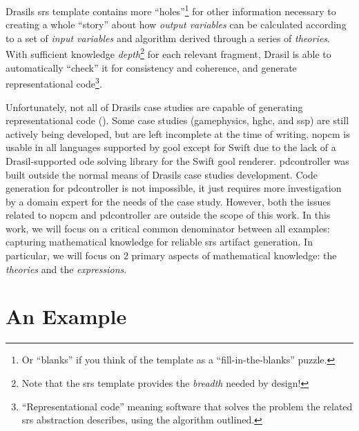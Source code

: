 Drasils \acs{srs} template contains more ``holes''\footnote{Or ``blanks'' if you
      think of the template as a ``fill-in-the-blanks'' puzzle.} for other
information necessary to creating a whole ``story'' about how
\textit{output variables} can be calculated according to a set of
\textit{input variables} and algorithm derived through a series of
\textit{theories}. With sufficient knowledge \textit{depth}\footnote{Note
      that the \acs{srs} template provides the \textit{breadth} needed by
      design!} for each relevant fragment, Drasil is able to automatically
``check'' it for consistency and coherence, and generate representational
code\footnote{``Representational code'' meaning software that solves the
      problem the related \acs{srs} abstraction describes, using the algorithm
      outlined.}.

Unfortunately, not all of Drasils case studies are capable of generating
representational code (). Some case studies
(\acs{gamephysics}, \acs{hghc}, and \acs{ssp}) are still actively being
developed, but are left incomplete at the time of writing. \acs{nopcm} is usable
in all languages supported by \acs{gool} except for Swift due to the lack of a
Drasil-supported \acs{ode} solving library for the Swift \acs{gool} renderer.
\acs{pdcontroller} was built \cite{DrasilPR2289Naveen} outside  the normal means
of Drasils case studies development. Code generation for \acs{pdcontroller} is
not impossible, it just requires more investigation by a domain expert for the
needs of the case study. However, both the issues related to \acs{nopcm} and
\acs{pdcontroller} are outside the scope of this work. In this work, we will
focus on a critical common denominator between all examples: capturing
mathematical knowledge for reliable \acs{srs} artifact generation. In
particular, we will focus on 2 primary aspects of mathematical knowledge: the
\textit{theories} and the \textit{expressions}.

\caseStudiesCodeTable{}

\section{An Example}
\label{chap:drasil:sec:example}

